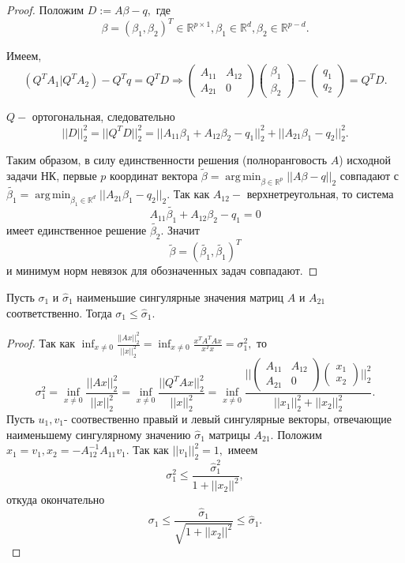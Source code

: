 \documentclass[12 pt, russian]{article}
\DeclareMathOperator*{\argmin}{arg\,min}
\begin{document}
\begin{proof}
    Положим $D := A\beta - q,$ где $$ \beta = (\beta_1, \beta_2)^T \in \mathbb{R}^{p \times 1}, \beta_1 \in \mathbb{R}^{d},  \beta_2 \in \mathbb{R}^{p-d}.$$

    Имеем,
    \[ (Q^T A_1 | Q^T A_2) - Q^Tq = Q^TD \Rightarrow \begin{pmatrix}
A_{11} & A_{12}\\
A_{21} & 0
\end{pmatrix}\begin{pmatrix}
\beta_1 \\
\beta_2 
\end{pmatrix} - \begin{pmatrix}
q_1 \\
q_2 
\end{pmatrix} =  Q^TD.\]

$Q-$ ортогональная, следовательно
\[ ||D||_2^2 = ||Q^TD||_2^2 = ||A_{11}\beta_1 +  A_{12} \beta_2 - q_1||_2^2 + ||A_{21} \beta_1 - q_2||_2^2. \]

Таким образом, в силу единственности решения (полноранговость $A$) исходной задачи НК, первые $p$ координат вектора $\tilde{\beta} =\argmin_{\beta \in \mathbb{R}^{p}}||A\beta - q||_2 $ совпадают с $\tilde{\beta_1}=\argmin_{\beta_1 \in \mathbb{R}^{d}}||A_{21} \beta_1 - q_2||_2.$ Так как $A_{12}-$ верхнетреугольная, то система $$A_{11}\tilde{\beta_1} +  A_{12} \beta_2 - q_1 = 0$$ имеет единственное решение $\tilde{\beta_2}.$ Значит
\[ \tilde{\beta} = (\tilde{\beta_1}, \tilde{\beta_1})^T \]
и минимум норм невязок для обозначенных задач совпадают.

\end{proof}

\begin{Statemnt}
Пусть $\sigma_1 $ и $\hat{\sigma}_1$ наименьшие сингулярные значения матриц $A$ и $A_{21}$ соответственно. Тогда $\sigma_1 \leq \hat{\sigma}_1.$
\end{Statemnt}

\begin{proof}
    Так как $\inf_{x \neq 0} \frac{||Ax||^2_2}{||x||^2_2} = \inf_{x \neq 0} \frac{x^TA^TAx}{x^Tx} =\sigma_1^2, $ то 
    $$ \sigma_1^2 = \inf_{x \neq 0} \frac{||Ax||^2_2}{||x||^2_2} = \inf_{x \neq 0} \frac{||Q^TAx||^2_2}{||x||^2_2} = \inf_{x \neq 0} \frac{||\begin{pmatrix}
A_{11} & A_{12} \\
A_{21} & 0 
\end{pmatrix} \begin{pmatrix}
x_1 \\
x_2 
\end{pmatrix}||^2_2}{||x_1||^2_2 + ||x_2||^2_2}.$$
Пусть $u_1, v_1$- соотвественно правый и левый сингулярные векторы, отвечающие наименьшему сингулярному значению $\hat{\sigma}_1$ матрицы $A_{21}.$ Положим $x_1 = v_1, x_2 = -A_{12}^{-1}A_{11}v_1.$ Так как $||v_1||_2^2 = 1,$ имеем
$$ \sigma_1^2 \leq \frac{\hat{\sigma}^2_1}{1+||x_2||^2}, $$
откуда окончательно 
$$ \sigma_1 \leq \frac{\hat{\sigma}_1}{\sqrt{1+||x_2||^2}} \leq \hat{\sigma}_1.$$
\end{proof}
\end{document}
